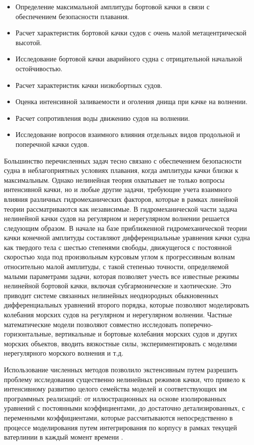 \begin{itemize}
	\item	Определение максимальной амплитуды бортовой качки в связи с обеспечением безопасности плавания.
	\item	Расчет характеристик бортовой качки судов с очень малой метацентрической высотой.
	\item	Исследование бортовой качки аварийного судна с отрицательной начальной остойчивостью.
	\item	Расчет характеристик качки низкобортных судов.
	\item	Оценка интенсивной заливаемости и оголения днища при качке на волнении.
	\item	Расчет сопротивления воды движению судов на волнении.
	\item	Исследование вопросов взаимного влияния отдельных видов продольной и поперечной качки судов.
\end{itemize}

Большинство перечисленных задач тесно связано с обеспечением безопасности судна в неблагоприятных условиях плавания, когда амплитуды качки близки к максимальным. Однако нелинейная теория охватывает не только вопросы интенсивной качки, но и любые другие задачи, требующие учета взаимного влияния различных гидромеханических факторов, которые в рамках линейной теории рассматриваются как независимые. В гидромеханической части задача нелинейной качки судов на регулярном и нерегулярном волнении решается следующим образом. В начале на базе приближенной гидромеханической теории качки конечной амплитуды составляют дифференциальные уравнения качки судна как твердого тела с шестью степенями свободы, движущегося с постоянной скоростью хода под произвольным курсовым углом к прогрессивным волнам относительно малой амплитуды, с такой степенью точности, определяемой малыми параметрами задачи, которая позволяет учесть все известные режимы нелинейной бортовой качки, включая субгармонические и хаотические. Это приводит системе связанных нелинейных неоднородных обыкновенных дифференциальных уравнений второго порядка, которые позволяют моделировать колебания морских судов на регулярном и нерегулярном волнении. Частные математические модели позволяют совместно исследовать поперечно-горизонтальные, вертикальные и бортовые колебания морских судов и других морских объектов, вводить вязкостные силы, экспериментировать с моделями нерегулярного морского волнения и т.д.

Использование численных методов позволило экстенсивным путем разрешить проблему исследования существенно нелинейных режимов качки, что привело к интенсивному развитию целого семейства моделей и соответствующих им программных реализаций: от иллюстрационных \citep{dk19}\citep{dk20} на основе изолированных уравнений с постоянными коэффициентами, до достаточно детализированных, с переменными коэффициентами, которые рассчитываются непосредственно в процессе моделирования путем интегрирования по корпусу в рамках текущей ватерлинии в каждый момент времени \citep{dk21}\citep{dk22}.


